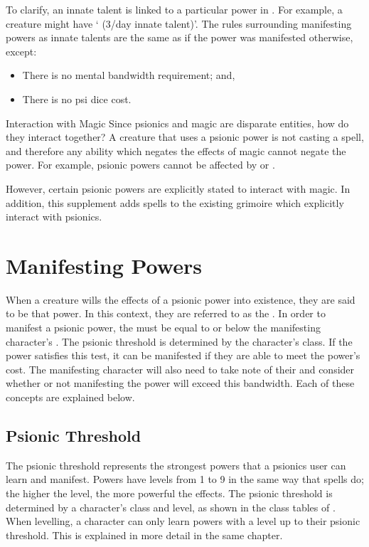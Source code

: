 To clarify,
an innate talent is linked to a particular power
in .
For example,
a creature might have
` (3/day innate talent)'.
The rules surrounding manifesting powers
as innate talents are the same as if
the power was manifested otherwise, except:
\begin{itemize}
    \item There is no mental bandwidth requirement; and,
    \item There is no psi dice cost.
\end{itemize}

\begin{DndSidebar}[float=htbp]{Interaction with Magic}
    Since
    psionics and magic are disparate entities,
    how do they interact together?
    A creature that uses a psionic power is not
    casting a spell,
    and therefore any ability which negates the effects
    of magic cannot negate the power.
    For example, psionic powers cannot be affected by
     or .

    However, certain psionic powers are explicitly stated
    to interact with magic.
    In addition, this supplement adds spells to the existing
    grimoire which explicitly interact with psionics.
\end{DndSidebar}

\section{Manifesting Powers}
\label{sec:manifesting_powers}
When a creature wills the effects of a psionic power
into existence,
they are said to be  that power.
In this context,
they are referred to as the .
In order to manifest a psionic power,
the  must be equal to or below
the manifesting character's .
The psionic threshold is determined by the character's class.
If the power satisfies this test,
it can be manifested if they are able to
meet the power's  cost.
The manifesting character will also need to take note of their
 and consider whether or not manifesting
the power will exceed this bandwidth.
Each of these concepts are explained below.

\subsection{Psionic Threshold}
The psionic threshold represents the strongest powers
that a psionics user can learn and manifest.
Powers have levels from 1 to 9 in the same way that spells do;
the higher the level, the more powerful the effects.
The psionic threshold is determined by a character's class
and level,
as shown in the class tables of .
When levelling,
a character can only learn powers with a level up to
their psionic threshold.
This is explained in more detail in the same chapter.


